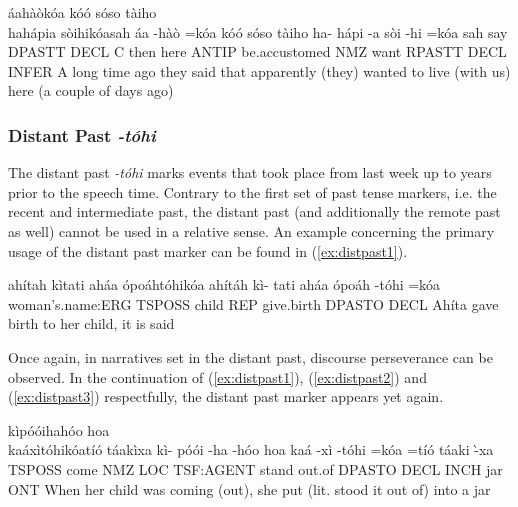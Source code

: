 \documentclass[a4paper, 12pt, oneside]{memoir}
\newcommand{\emh}[1]{\textit{#1}}
\begin{document}
\begin{examples}
    \ex \label{ex:intpast4}
    \newbaarucmd{\cl}{\baarujuncture{\texttt{==}}}
    \words áahàòkóa kóó sóso tàiho \\ hahápia sòihikóasah
    \bits áa -hàò =kóa kóó sóso tàiho ha- hápi -a sòi -hi =kóa \cl sah 
    \gloss say DPASTT DECL C then here ANTIP be.accustomed NMZ want RPASTT DECL INFER
    \tr A long time ago they said that apparently (they) wanted to live (with us) here (a couple of days ago)
\end{examples} 
\subsubsection{Distant Past \emh{-tóhi}}\label{s:distpast}
The distant past \emh{-tóhi} marks events that took place from last week up to years prior to the speech time. Contrary to the first set of past tense markers, i.e. the recent and intermediate past, the distant past (and additionally the remote past as well) cannot be used in a relative sense. An example concerning the primary usage of the distant past marker can be found in (\ref{ex:distpast1}).
\begin{examples}
    \ex \label{ex:distpast1}
    \words ahítah kìtati aháa ópoáhtóhikóa 
    \bits ahítáh kì- tati aháa ópoáh -tóhi =kóa 
    \gloss woman's.name:ERG TSPOSS child REP give.birth DPASTO DECL 
    \tr Ahíta gave birth to her child, it is said
\end{examples}
Once again, in narratives set in the distant past, discourse perseverance can be observed. In the continuation of (\ref{ex:distpast1}), (\ref{ex:distpast2}) and (\ref{ex:distpast3}) respectfully, the distant past marker appears yet again. 
\begin{examples}
    \ex \label{ex:distpast2}
    \words kìpóóihahóo hoa \\ kaáxìtóhikóatíó táakìxa
    \bits kì- póói -ha -hóo hoa kaá -xì -tóhi =kóa =tíó táaki -̀xa
    \gloss TSPOSS come NMZ LOC TSF:AGENT stand out.of DPASTO DECL INCH jar ONT
    \tr When her child was coming (out), she put (lit. stood it out of) into a jar
    \ex \label{ex:distpast3}
\end{examples}
\end{document}
